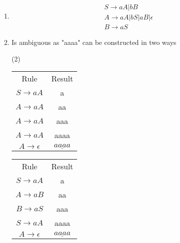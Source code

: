 \documentclass{article} %
\begin{document}
    \section{}
        \begin{enumerate}
            \item
            \begin{gather*}
                S \to aA | bB\\
                A \to aA | bS | aB | \epsilon\\
                B \to aS
            \end{gather*}
            \item Is ambiguous as "aaaa" can be constructed in two ways
            \begin{center}
                \begin{varwidth}{\textwidth}
                \begin{tasks}[label={(\Roman*)},label-width={1cm}] (2)
                    \task
                    \begin{tabular}{ c c}
                        Rule & Result\\
                        $S \to aA$ & a\\
                        $A \to aA$ & aa\\
                        $A \to aA$ & aaa\\
                        $A \to aA$ & aaaa\\
                        $A \to \epsilon$ & $\underline{aaaa}$
                    \end{tabular}

                    \task
                    \begin{tabular}{ c c}
                        Rule & Result\\
                        $S \to aA$ & a\\
                        $A \to aB$ & aa\\
                        $B \to aS$ & aaa\\
                        $S \to aA$ & aaaa\\
                        $A \to \epsilon$ & $\underline{aaaa}$
                    \end{tabular}
                \end{tasks}
                \end{varwidth}
            \end{center}
        \end{enumerate}
\end{document}
